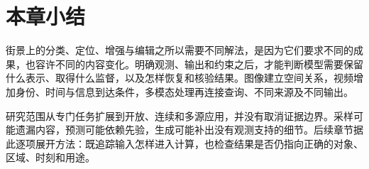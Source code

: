 \section{本章小结}
\label{sec:vision-overview-summary}

街景上的分类、定位、增强与编辑之所以需要不同解法，是因为它们要求不同的成果，也容许不同的内容变化。明确观测、输出和约束之后，才能判断模型需要保留什么表示、取得什么监督，以及怎样恢复和核验结果。图像建立空间关系，视频增加身份、时间与信息到达条件，多模态处理再连接查询、不同来源及不同输出。

研究范围从专门任务扩展到开放、连续和多源应用，并没有取消证据边界。采样可能遗漏内容，预测可能依赖先验，生成可能补出没有观测支持的细节。后续章节据此逐项展开方法：既追踪输入怎样进入计算，也检查结果是否仍指向正确的对象、区域、时刻和用途。

